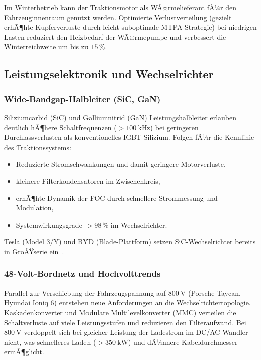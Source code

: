 ﻿\documentclass[a4paper,12pt]{article}
\theoremstyle{definition}
\begin{document}
Im Winterbetrieb kann der Traktionsmotor als WÃ¤rmelieferant fÃ¼r den
Fahrzeuginnenraum genutzt werden. Optimierte Verlustverteilung (gezielt erhÃ¶hte
Kupferverluste durch leicht suboptimale MTPA-Strategie) bei niedrigen Lasten
reduziert den Heizbedarf der WÃ¤rmepumpe und verbessert die Winterreichweite
um bis zu $15\,\%$.

\subsection{Leistungselektronik und Wechselrichter}

\subsubsection{Wide-Bandgap-Halbleiter (SiC, GaN)}

Siliziumcarbid (SiC) und Galliumnitrid (GaN) Leistungshalbleiter erlauben
deutlich hÃ¶here Schaltfrequenzen ($>\SI{100}{\kilo\hertz}$) bei geringeren
Durchlassverlusten als konventionelles IGBT-Silizium. Folgen fÃ¼r die
Kennlinie des Traktionssystems:
\begin{itemize}
    \item Reduzierte Stromschwankungen und damit geringere Motorverluste,
    \item kleinere Filterkondensatoren im Zwischenkreis,
    \item erhÃ¶hte Dynamik der FOC durch schnellere Strommessung und
          Modulation,
    \item Systemwirkungsgrade $> 98\,\%$ im Wechselrichter.
\end{itemize}
Tesla (Model 3/Y) und BYD (Blade-Plattform) setzen SiC-Wechselrichter bereits
in GroÃŸserie ein~\cite{wang2020sic}.

\subsubsection{48-Volt-Bordnetz und Hochvolttrends}

Parallel zur Verschiebung der Fahrzeugspannung auf $\SI{800}{\volt}$
(Porsche Taycan, Hyundai Ioniq 6) entstehen neue Anforderungen an die
Wechselrichtertopologie. Kaskadenkonverter und Modulare Multilevelkonverter
(MMC) verteilen die Schaltverluste auf viele Leistungsstufen und reduzieren
den Filteraufwand. Bei $\SI{800}{\volt}$ verdoppelt sich bei gleicher Leistung
der Ladestrom im DC/AC-Wandler nicht, was schnelleres Laden ($>\SI{350}{\kilo\watt}$)
und dÃ¼nnere Kabeldurchmesser ermÃ¶glicht.
\end{document}
